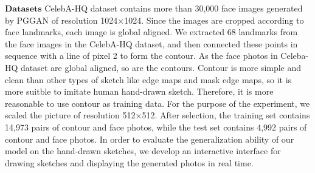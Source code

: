 \documentclass[10pt,twocolumn,letterpaper]{article}
\begin{document}
\noindent
$\mathbf{Datasets}$ CelebA-HQ dataset contains more than 30,000 face images generated by PGGAN\cite{pggan} of resolution 1024×1024. Since the images are cropped according to face landmarks, each image is global aligned. 
We extracted 68 landmarks from the face images in the CelebA-HQ dataset, and then connected these points in sequence with a line of pixel 2 to form the contour. As the face photos in Celeba-HQ dataset are global aligned, so are the contours. Contour is more simple and clean than other types of sketch like edge maps\cite{csagan} and mask edge maps\cite{maskgan}, so it is more suitble to imitate human hand-drawn sketch. Therefore, it is more reasonable to use contour as training data.
For the purpose of the experiment, we scaled the picture of resolution 512×512. After selection, the training set contains 14,973 pairs of contour and face photos, while the test set contains 4,992 pairs of contour and face photos. 
In order to evaluate the generalization ability of our model on the hand-drawn sketches, we develop an interactive interface for drawing sketches and displaying the generated photos in real time.
\end{document}
